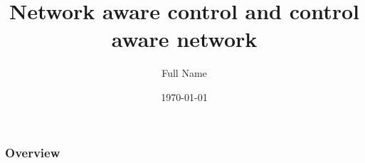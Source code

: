 \documentclass{beamer}
\title[NICCI]{Network aware control and control aware network} %
\author[Shortname]{Full Name %
 } %
\institute[Paderborn University] %
{
Dept. of Electrical Engineering and Information Technology, \\
Paderborn University \\ %
\textit{something@upb.de}\\
}
\date{\today} %
\begin{document}
\begin{frame}
\titlepage %
\end{frame}

\begin{frame}
\frametitle{Overview} %
\tableofcontents %
\end{frame}
\end{document}
